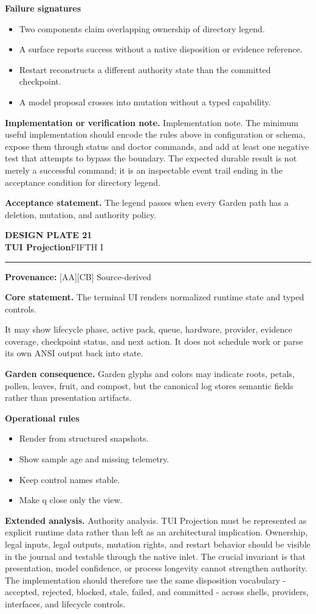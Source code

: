 \documentclass[10pt,letterpaper,oneside]{article}
\newcommand{\prov}[1]{\textcolor{gardenBlue}{\sffamily\footnotesize\textbf{Provenance:} #1}}
\newcommand{\platetitle}[3]{%
  \begin{minipage}[t][0.54in][t]{\textwidth}
  {\sffamily\bfseries\color{gardenDeep}\fontsize{9}{10}\selectfont DESIGN PLATE #1}\\[-1pt]
  {\sffamily\bfseries\color{gardenInk}\fontsize{16.5}{18}\selectfont #2}\hfill{\sffamily\color{gardenGreen}\large #3}
  \end{minipage}\vspace{-2pt}\hrule\vspace{5pt}}
\begin{document}
\textbf{Failure signatures}
\begin{itemize}
\item Two components claim overlapping ownership of directory legend.
\item A surface reports success without a native disposition or evidence reference.
\item Restart reconstructs a different authority state than the committed checkpoint.
\item A model proposal crosses into mutation without a typed capability.
\end{itemize}
\textbf{Implementation or verification note.} Implementation note. The minimum useful implementation should encode the rules above in configuration or schema, expose them through status and doctor commands, and add at least one negative test that attempts to bypass the boundary. The expected durable result is not merely a successful command; it is an inspectable event trail ending in the acceptance condition for directory legend.

\begin{acceptbox}
\textbf{Acceptance statement.} The legend passes when every Garden path has a deletion, mutation, and authority policy.
\end{acceptbox}
\newpage
\platetitle{21}{TUI Projection}{FIFTH I}
\prov{[AA][CB] Source-derived}
\fontsize{8.85}{10.45}\selectfont
\begin{corebox}
\textbf{Core statement.} The terminal UI renders normalized runtime state and typed controls.
\end{corebox}
It may show lifecycle phase, active pack, queue, hardware, provider, evidence coverage, checkpoint status, and next action. It does not schedule work or parse its own ANSI output back into state.

\textbf{Garden consequence.} Garden glyphs and colors may indicate roots, petals, pollen, leaves, fruit, and compost, but the canonical log stores semantic fields rather than presentation artifacts.

\textbf{Operational rules}
\begin{itemize}
\item Render from structured snapshots.
\item Show sample age and missing telemetry.
\item Keep control names stable.
\item Make q close only the view.
\end{itemize}
\textbf{Extended analysis.} Authority analysis. TUI Projection must be represented as explicit runtime data rather than left as an architectural implication. Ownership, legal inputs, legal outputs, mutation rights, and restart behavior should be visible in the journal and testable through the native inlet. The crucial invariant is that presentation, model confidence, or process longevity cannot strengthen authority. The implementation should therefore use the same disposition vocabulary - accepted, rejected, blocked, stale, failed, and committed - across shells, providers, interfaces, and lifecycle controls.
\end{document}
